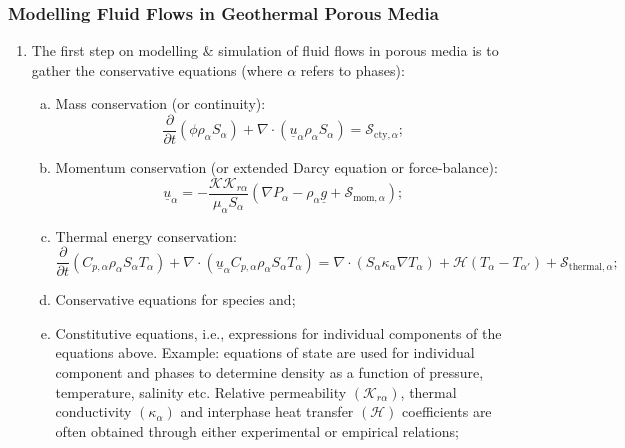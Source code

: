 \documentclass[10pt,compress]{beamer}
\newcommand{\frc}{\displaystyle\frac}
\begin{document}
\begin{frame}
 \frametitle{Modelling Fluid Flows in Geothermal Porous Media}
    \begin{enumerate}[1.]\scriptsize
       \item <1-> The first step on modelling $\&$ simulation of fluid flows in porous media is to gather the conservative equations (where $\alpha$ refers to phases):
          \begin{enumerate}[(a)]\scriptsize
             \item <2-> Mass conservation (or continuity):
                \begin{equation}
                   \frc{\partial}{\partial t} \left(\phi\rho_{\alpha}S_{\alpha}\right) + \nabla\cdot\left(\underline{u}_{\alpha}\rho_{\alpha}S_{\alpha}\right) = \mathcal{S}_{\text{cty},\alpha};\label{eqn:continuity}
                \end{equation}
             \item <3-> Momentum conservation (or extended Darcy equation or force-balance):
                \begin{equation}
                   \underline{u}_{\alpha} = - \frc{\mathcal{K}\mathcal{K}_{r\alpha}}{\mu_{\alpha}S_{\alpha}}\left(\nabla P_{\alpha} - \rho_{\alpha}\underline{g} + \mathcal{S}_{\text{mom},\alpha}\right);\label{eqn:momentum}
                \end{equation}
             \item <4-> Thermal energy conservation:
                \begin{equation}
                   \frc{\partial}{\partial t} \left(C_{p,\alpha}\rho_{\alpha}S_{\alpha}T_{\alpha}\right) + \nabla\cdot\left(\underline{u}_{\alpha}C_{p,\alpha}\rho_{\alpha}S_{\alpha}T_{\alpha}\right) = \nabla\cdot\left(S_{\alpha}\kappa_{\alpha}\nabla T_{\alpha}\right) + \mathcal{H}\left(T_{\alpha}-T_{\alpha'}\right) + \mathcal{S}_{\text{thermal},\alpha};\label{eqn:energy}
                \end{equation}
             \item <5-> Conservative equations for species and;
             \item <5-> Constitutive equations, i.e., expressions for individual components of the equations above. Example: equations of state are used for individual component and phases to determine density as a function of pressure, temperature, salinity etc. Relative permeability $\left(\mathcal{K}_{r\alpha}\right)$, thermal conductivity $\left(\kappa_{\alpha}\right)$ and interphase heat transfer $\left(\mathcal{H}\right)$ coefficients are often obtained through either experimental or empirical relations;
          \end{enumerate}
    \end{enumerate}

\end{frame}
\end{document}

